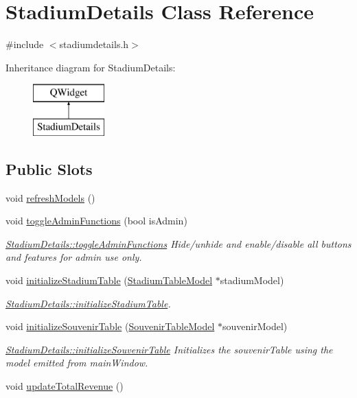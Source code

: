 \hypertarget{class_stadium_details}{}\section{Stadium\+Details Class Reference}
\label{class_stadium_details}


{\ttfamily \#include $<$stadiumdetails.\+h$>$}

Inheritance diagram for Stadium\+Details\+:\begin{figure}[H]
\begin{center}
\leavevmode
\includegraphics[height=2.000000cm]{class_stadium_details}
\end{center}
\end{figure}
\subsection*{Public Slots}
\begin{DoxyCompactItemize}
\item 
void \hyperlink{class_stadium_details_a0868c6ed136cf59f3ab4afe71d01833c}{refresh\+Models} ()
\item 
void \hyperlink{class_stadium_details_a011c0e49c863d55f34de7bfd85a9fdf3}{toggle\+Admin\+Functions} (bool is\+Admin)
\begin{DoxyCompactList}\small\item\em \hyperlink{class_stadium_details_a011c0e49c863d55f34de7bfd85a9fdf3}{Stadium\+Details\+::toggle\+Admin\+Functions} Hide/unhide and enable/disable all buttons and features for admin use only. \end{DoxyCompactList}\item 
void \hyperlink{class_stadium_details_a9e249b86f719d2f23aa1eb55de90a287}{initialize\+Stadium\+Table} (\hyperlink{class_stadium_table_model}{Stadium\+Table\+Model} $\ast$stadium\+Model)
\begin{DoxyCompactList}\small\item\em \hyperlink{class_stadium_details_a9e249b86f719d2f23aa1eb55de90a287}{Stadium\+Details\+::initialize\+Stadium\+Table}. \end{DoxyCompactList}\item 
void \hyperlink{class_stadium_details_a5f3a91287d68868421f77dd1d275b307}{initialize\+Souvenir\+Table} (\hyperlink{class_souvenir_table_model}{Souvenir\+Table\+Model} $\ast$souvenir\+Model)
\begin{DoxyCompactList}\small\item\em \hyperlink{class_stadium_details_a5f3a91287d68868421f77dd1d275b307}{Stadium\+Details\+::initialize\+Souvenir\+Table} Initializes the souvenir\+Table using the model emitted from main\+Window. \end{DoxyCompactList}\item 
void \hyperlink{class_stadium_details_afae941fb61d0b6845cd3200d5003297a}{update\+Total\+Revenue} ()
\end{DoxyCompactItemize}
